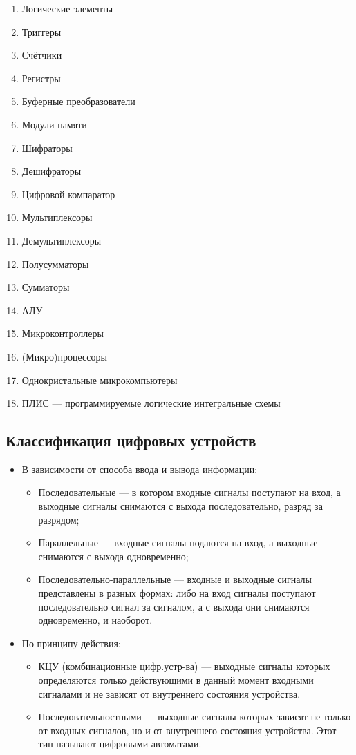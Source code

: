 \begin{enumerate}
\item Логические элементы
\item Триггеры
\item Счётчики
\item Регистры
\item Буферные преобразователи
\item Модули памяти
\item Шифраторы
\item Дешифраторы
\item Цифровой компаратор
\item Мультиплексоры
\item Демультиплексоры
\item Полусумматоры
\item Сумматоры
\item АЛУ
\item Микроконтроллеры
\item (Микро)процессоры
\item Однокристальные микрокомпьютеры
\item ПЛИС --- программируемые логические интегральные схемы
\end{enumerate}

\subsection*{Классификация цифровых устройств}

\begin{itemize}
\item В зависимости от способа ввода и вывода информации:
	\begin{itemize}
	\item Последовательные --- в котором входные сигналы поступают на вход, а выходные сигналы снимаются с выхода последовательно, разряд за разрядом;
	\item Параллельные --- входные сигналы подаются на вход, а выходные снимаются с выхода одновременно;
	\item Последовательно-параллельные --- входные и выходные сигналы представлены в разных формах: либо на вход сигналы поступают последовательно сигнал за сигналом, а с выхода они снимаются одновременно, и наоборот.
	\end{itemize}
\item По принципу действия:
	\begin{itemize}
	\item КЦУ (комбинационные цифр.устр-ва) --- выходные сигналы которых определяются только действующими в данный момент входными сигналами и не зависят от внутреннего состояния устройства.
	\item Последовательностными --- выходные сигналы которых зависят не только от входных сигналов, но и от внутреннего состояния устройства. Этот тип называют цифровыми автоматами.
	\end{itemize}
\end{itemize}

